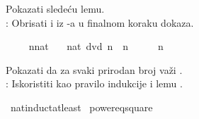 \begin{isabellebody}
\begin{exercise}[subtitle=Množenje matrica]
\isadelimproof
%
\endisadelimproof
%
\isatagproof
%
\endisatagproof
{\isafoldproof}%
%
\isadelimproof
%
\endisadelimproof
%
\end{exercise}
%
\begin{exercise}[subtitle=Deljivost]
%
\begin{isamarkuptext}%
Pokazati sledeću lemu.\\
      : Obrisati  i  iz -a u 
      finalnom koraku dokaza.%
\end{isamarkuptext}\isamarkuptrue%
\isamarkupfalse%
\ \isanewline
\ \ \ n{\isacharcolon}{\kern0pt}{\isacharcolon}{\kern0pt}nat\isanewline
\ \ \ {\isachardoublequoteopen}{\isacharparenleft}{\kern0pt}{}{\isacharcolon}{\kern0pt}{\isacharcolon}{\kern0pt}nat{\isacharparenright}{\kern0pt}\ dvd\ n\ {\isacharasterisk}{\kern0pt}\ {\isacharparenleft}{\kern0pt}n\ {\isacharplus}{\kern0pt}\ {}{\isacharparenright}{\kern0pt}\ {\isacharasterisk}{\kern0pt}\ {\isacharparenleft}{\kern0pt}{}\ {\isacharasterisk}{\kern0pt}\ n\ {\isacharplus}{\kern0pt}\ {}{\isacharparenright}{\kern0pt}{\isachardoublequoteclose}%
\isadelimproof
%
\endisadelimproof
%
\isatagproof
%
\endisatagproof
{\isafoldproof}%
%
\isadelimproof
%
\endisadelimproof
%
\end{exercise}
%
\begin{exercise}[subtitle=Nejednakost]
%
\begin{isamarkuptext}%
Pokazati da za svaki prirodan broj  važi .\\
     : Iskoristiti  kao pravilo indukcije i 
              lemu .%
\end{isamarkuptext}\isamarkuptrue%
\isamarkupfalse%
\ nat{\isacharunderscore}{\kern0pt}induct{\isacharunderscore}{\kern0pt}at{\isacharunderscore}{\kern0pt}least\isanewline
{}\isamarkupfalse%
\ power{}{\isacharunderscore}{\kern0pt}eq{\isacharunderscore}{\kern0pt}square\isanewline
\isanewline

\end{exercise}
\end{isabellebody}
